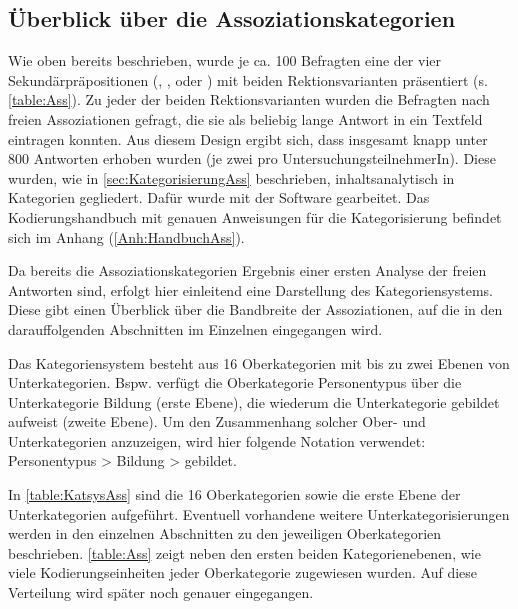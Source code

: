 \subsection{Überblick über die Assoziationskategorien}
\label{sec:ErgAssKat}
Wie oben bereits beschrieben, wurde je ca. 100 Befragten eine der vier Sekundärpräpositionen (\wegen, \waehrend, \dank{} oder \gegenueber) mit beiden Rektionsvarianten präsentiert (s. \autoref{table:Ass}). 
Zu jeder der beiden Rektionsvarianten wurden die Befragten nach freien Assoziationen gefragt, die sie als beliebig lange Antwort in ein Textfeld eintragen konnten. 
Aus diesem Design ergibt sich, dass insgesamt knapp unter 800 Antworten erhoben wurden (je zwei pro UntersuchungsteilnehmerIn). 
Diese wurden, wie in \autoref{sec:KategorisierungAss} beschrieben, inhaltsanalytisch in Kategorien gegliedert.
Dafür wurde mit der Software \citet{MAXQDA.19892018} gearbeitet. 
Das Kodierungshandbuch mit genauen Anweisungen für die Kategorisierung befindet sich im Anhang (\autoref{Anh:HandbuchAss}).
 
Da bereits die Assoziationskategorien Ergebnis einer ersten Analyse der freien Antworten sind, erfolgt hier einleitend eine Darstellung des Kategoriensystems. 
Diese gibt einen Überblick über die Bandbreite der Assoziationen, auf die in den darauffolgenden Abschnitten im Einzelnen eingegangen wird. 

Das Kategoriensystem besteht aus 16 Oberkategorien mit bis zu zwei Ebenen von Unterkategorien. 
Bspw. verfügt die Oberkategorie \glqq Personentypus\grqq{} über die Unterkategorie \glqq Bildung\grqq{} (erste Ebene), die wiederum die Unterkategorie \glqq gebildet\grqq{} aufweist (zweite Ebene). 
Um den Zusammenhang solcher Ober- und Unterkategorien anzuzeigen, wird hier folgende Notation verwendet: \glqq Personentypus > Bildung > gebildet\grqq.

In \autoref{table:KatsysAss} sind die 16 Oberkategorien sowie die erste Ebene der Unterkategorien aufgeführt. 
Eventuell vorhandene weitere Unterkategorisierungen werden in den einzelnen Abschnitten zu den jeweiligen Oberkategorien beschrieben.
\autoref{table:Ass} zeigt neben den ersten beiden Kategorienebenen, wie viele Kodierungseinheiten jeder Oberkategorie zugewiesen wurden. 
Auf diese Verteilung wird später noch genauer eingegangen. 

